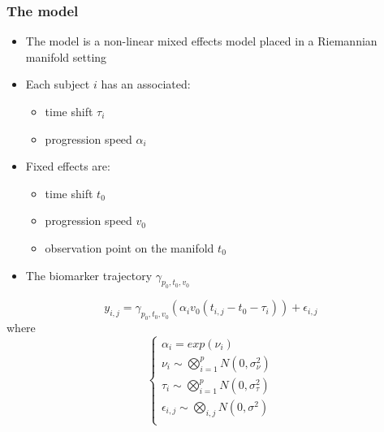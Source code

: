 \documentclass[10pt,xcolor=table]{beamer}
\begin{document}
\begin{frame}
\frametitle{The model}

\begin{itemize}

 \item The model is a non-linear mixed effects model placed in a Riemannian manifold setting
  \item Each subject $i$ has an associated:
  \begin{itemize}
  \item time shift $\tau_i$
  \item progression speed $\alpha_i$
  \end{itemize}
  \item Fixed effects are:
  \begin{itemize}
  \item time shift $t_0$
  \item progression speed $v_0$
  \item observation point on the manifold $t_0$
  \end{itemize}
  \item The biomarker trajectory $\gamma_{p_0,t_0,v_0}$


\end{itemize}


\begin{equation}
  y_{i,j} = \gamma_{p_0,t_0,v_0}(\alpha_iv_0(t_{i,j}-t_0-\tau_i))+\epsilon_{i,j} 
\end{equation}
where
\begin{equation}
\label{eq:manifold2}
\begin{cases}
  \alpha_i = exp(\nu_i)\\
  \nu_i \sim \bigotimes_{i=1}^p N(0, \sigma_{\nu}^2)\\  
  \tau_i \sim \bigotimes_{i=1}^p N(0, \sigma_{\tau}^2)\\  
  \epsilon_{i,j} \sim \bigotimes_{i,j} N(0, \sigma^2)\\  
\end{cases}
\end{equation}

\end{frame}

% 
% 
\end{document}
